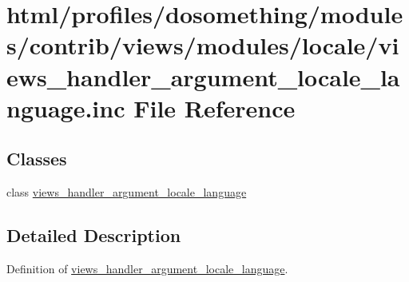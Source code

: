 \hypertarget{views__handler__argument__locale__language_8inc}{
\section{html/profiles/dosomething/modules/contrib/views/modules/locale/views\_\-handler\_\-argument\_\-locale\_\-language.inc File Reference}
\label{views__handler__argument__locale__language_8inc}
}
\subsection*{Classes}
\begin{DoxyCompactItemize}
\item 
class \hyperlink{classviews__handler__argument__locale__language}{views\_\-handler\_\-argument\_\-locale\_\-language}
\end{DoxyCompactItemize}


\subsection{Detailed Description}
Definition of \hyperlink{classviews__handler__argument__locale__language}{views\_\-handler\_\-argument\_\-locale\_\-language}. 
